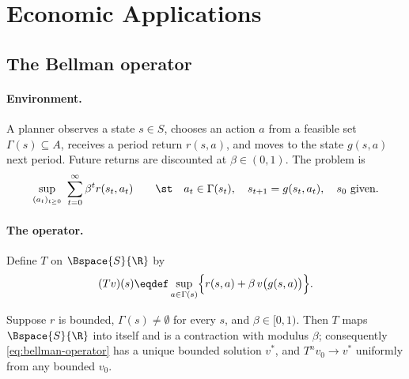 \section{Economic Applications}\label{sec:comp-applications}

\subsection{The Bellman operator}\label{subsec:comp-bellman}

\paragraph{Environment.} A planner observes a state $s\in S$, chooses an action
$a$ from a feasible set $\Gamma(s)\subseteq A$, receives a period return
$r(s,a)$, and moves to the state $g(s,a)$ next period. Future returns are
discounted at $\beta\in(0,1)$. The problem is
\begin{equation}\label{eq:sequence-problem}
	\sup_{(a_t)_{t\geq0}}\ \sum_{t=0}^{\infty}\beta^tr(s_t,a_t)
	\qquad\st\quad a_t\in\Gamma(s_t),\quad s_{t+1}=g(s_t,a_t),\quad s_0\text{ given}.
\end{equation}

\paragraph{The operator.} Define $T$ on $\Bspace{S}{\R}$ by
\begin{equation}\label{eq:bellman-operator}
	(Tv)(s)\eqdef\sup_{a\in\Gamma(s)}\Bigl\{r(s,a)+\beta\,v\bigl(g(s,a)\bigr)\Bigr\}.
\end{equation}

\begin{proposition}\label{prop:bellman-contraction}
	Suppose $r$ is bounded, $\Gamma(s)\neq\emptyset$ for every $s$, and
	$\beta\in[0,1)$. Then $T$ maps $\Bspace{S}{\R}$ into itself and is a contraction
	with modulus $\beta$; consequently \eqref{eq:bellman-operator} has a unique
	bounded solution $v^\ast$, and $T^nv_0\to v^\ast$ uniformly from any bounded
	$v_0$.
\end{proposition}

